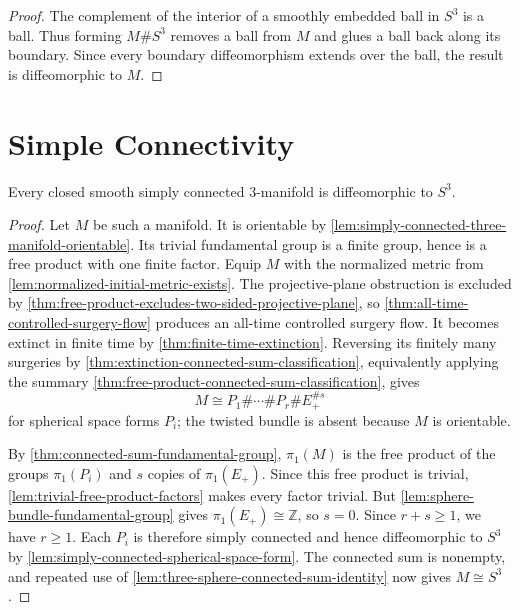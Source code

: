 \begin{proof}
The complement of the interior of a smoothly embedded ball in $S^3$ is a
ball.  Thus forming $M\#S^3$ removes a ball from $M$ and glues a ball back
along its boundary.  Since every boundary diffeomorphism extends over the
ball, the result is diffeomorphic to $M$.
\end{proof}

\section{Simple Connectivity}

\begin{theorem}
\label{thm:poincare-conjecture}
\notready
Every closed smooth simply connected $3$-manifold is diffeomorphic to $S^3$.
\end{theorem}

\begin{proof}
Let $M$ be such a manifold.  It is orientable by
\ref{lem:simply-connected-three-manifold-orientable}.  Its trivial
fundamental group is a finite group, hence is a free product with one finite
factor.  Equip $M$ with the normalized metric from
\ref{lem:normalized-initial-metric-exists}.  The projective-plane obstruction
is excluded by \ref{thm:free-product-excludes-two-sided-projective-plane}, so
\ref{thm:all-time-controlled-surgery-flow} produces an all-time controlled
surgery flow.  It becomes extinct in finite time by
\ref{thm:finite-time-extinction}.  Reversing its finitely many surgeries by
\ref{thm:extinction-connected-sum-classification}, equivalently applying the
summary \ref{thm:free-product-connected-sum-classification}, gives
\[
 M\cong P_1\#\cdots\#P_r\#E_+^{\# s}
\]
for spherical space forms $P_i$; the twisted bundle is absent because $M$ is
orientable.

By \ref{thm:connected-sum-fundamental-group}, $\pi_1(M)$ is the free product
of the groups $\pi_1(P_i)$ and $s$ copies of $\pi_1(E_+)$.  Since this free
product is trivial, \ref{lem:trivial-free-product-factors} makes every factor
trivial.  But \ref{lem:sphere-bundle-fundamental-group} gives
$\pi_1(E_+)\cong\mathbb Z$, so $s=0$.  Since $r+s\ge1$, we have $r\ge1$.
Each $P_i$ is therefore simply connected and hence diffeomorphic to $S^3$ by
\ref{lem:simply-connected-spherical-space-form}.  The connected sum is
nonempty, and repeated use of
\ref{lem:three-sphere-connected-sum-identity} now gives $M\cong S^3$.
\end{proof}
